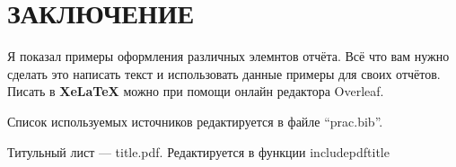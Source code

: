 \documentclass[14pt, a4paper]{extarticle}
\begin{document}
\section*{ЗАКЛЮЧЕНИЕ} 
Я показал примеры оформления различных элемнтов отчёта. Всё что вам нужно сделать это написать текст и использовать данные примеры для своих отчётов. Писать в \textbf{XeLaTeX}\cite{overleaf-xelatex} можно при помощи онлайн редактора Overleaf\cite{overleaf}.

Список используемых источников редактируется в файле ``prac.bib''.

Титульный лист --- title.pdf. Редактируется в функции includepdf{title}
\printbibliography[title=СПИСОК ИСПОЛЬЗУЕМЫХ ИСТОЧНИКОВ]
\end{document}
